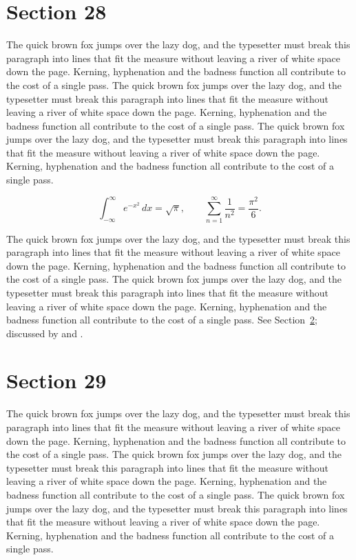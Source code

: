 \documentclass{article}
\begin{document}
\section{Section 28}
\label{sec:28}
The quick brown fox jumps over the lazy dog, and the typesetter must break this paragraph into lines that fit the measure without leaving a river of white space down the page. Kerning, hyphenation and the badness function all contribute to the cost of a single pass. The quick brown fox jumps over the lazy dog, and the typesetter must break this paragraph into lines that fit the measure without leaving a river of white space down the page. Kerning, hyphenation and the badness function all contribute to the cost of a single pass. The quick brown fox jumps over the lazy dog, and the typesetter must break this paragraph into lines that fit the measure without leaving a river of white space down the page. Kerning, hyphenation and the badness function all contribute to the cost of a single pass. 

\begin{equation}\label{eq:28}
\int_{-\infty}^{\infty} e^{-x^{2}}\,dx = \sqrt{\pi}, \qquad
\sum_{n=1}^{\infty} \frac{1}{n^{2}} = \frac{\pi^{2}}{6}.
\end{equation}

The quick brown fox jumps over the lazy dog, and the typesetter must break this paragraph into lines that fit the measure without leaving a river of white space down the page. Kerning, hyphenation and the badness function all contribute to the cost of a single pass. The quick brown fox jumps over the lazy dog, and the typesetter must break this paragraph into lines that fit the measure without leaving a river of white space down the page. Kerning, hyphenation and the badness function all contribute to the cost of a single pass. 
See Section~\ref{sec:29}; discussed by \textcite{k4} and \textcite{l1}.
\section{Section 29}
\label{sec:29}
The quick brown fox jumps over the lazy dog, and the typesetter must break this paragraph into lines that fit the measure without leaving a river of white space down the page. Kerning, hyphenation and the badness function all contribute to the cost of a single pass. The quick brown fox jumps over the lazy dog, and the typesetter must break this paragraph into lines that fit the measure without leaving a river of white space down the page. Kerning, hyphenation and the badness function all contribute to the cost of a single pass. The quick brown fox jumps over the lazy dog, and the typesetter must break this paragraph into lines that fit the measure without leaving a river of white space down the page. Kerning, hyphenation and the badness function all contribute to the cost of a single pass. 
\end{document}
